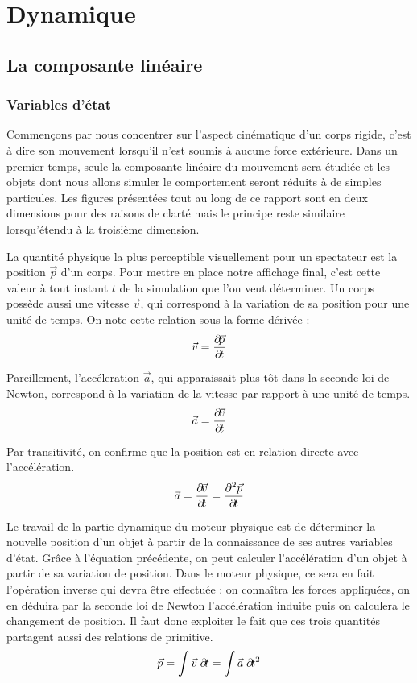 \section{Dynamique} 

\subsection{La composante linéaire}

\subsubsection{Variables d'état}

Commençons par nous concentrer sur l'aspect cinématique d'un corps
rigide, c'est à dire son mouvement lorsqu'il n'est soumis à aucune
force extérieure. Dans un premier temps, seule la composante linéaire
du mouvement sera étudiée et les objets dont nous allons simuler le
comportement seront réduits à de simples particules. Les figures
présentées tout au long de ce rapport sont en deux dimensions pour des
raisons de clarté mais le principe reste similaire lorsqu'étendu à la
troisième dimension.

La quantité physique la plus perceptible visuellement pour un
spectateur est la position $\vec p$ d'un corps. Pour mettre en place
notre affichage final, c'est cette valeur à tout instant $t$ de la
simulation que l'on veut déterminer. Un corps possède aussi une
vitesse $\vec v$, qui correspond à la variation de sa position pour
une unité de temps. On note cette relation sous la forme dérivée :
\begin{align*}
  \vec{v} = \frac{\partial \! \vec{p}}{\partial \! t}
\end{align*}

Pareillement, l'accéleration $\vec a$, qui apparaissait plus tôt dans
la seconde loi de Newton, correspond à la variation de la vitesse par
rapport à une unité de temps.
\begin{align*}
  \vec{a} = \frac{\partial \! \vec{v}}{\partial \! t}
\end{align*}

Par transitivité, on confirme que la position est en relation directe
avec l'accélération.
\begin{align*}
  \vec{a} = \frac{\partial \! \vec{v}}{\partial \! t} = \frac{\partial^2 \vec{p}}{\partial \! t}
\end{align*}

Le travail de la partie dynamique du moteur physique est de déterminer
la nouvelle position d'un objet à partir de la connaissance de ses
autres variables d'état. Grâce à l'équation précédente, on peut
calculer l'accélération d'un objet à partir de sa variation de
position. Dans le moteur physique, ce sera en fait l'opération inverse
qui devra être effectuée : on connaîtra les forces appliquées, on en
déduira par la seconde loi de Newton l'accélération induite puis on
calculera le changement de position. Il faut donc exploiter le fait
que ces trois quantités partagent aussi des relations de primitive.
\begin{align*}
  \vec{p} = \int \vec{v}\; \partial \! t = \int \vec{a}\; \partial \! t^2
\end{align*}

